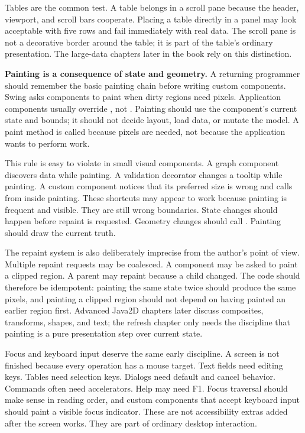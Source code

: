 Tables are the common test. A table belongs in a scroll pane because the header, viewport, and scroll bars cooperate. Placing a table directly in a panel may look acceptable with five rows and fail immediately with real data. The scroll pane is not a decorative border around the table; it is part of the table's ordinary presentation. The large-data chapters later in the book rely on this distinction.

\textbf{Painting is a consequence of state and geometry.} A returning
programmer should remember the basic painting chain before writing custom
components. Swing asks components to paint when dirty regions need pixels.
Application components usually override , not .
Painting should use the component's current state and bounds; it should not
decide layout, load data, or mutate the model. A paint method is called because
pixels are needed, not because the application wants to perform work.

This rule is easy to violate in small visual components. A graph component
discovers data while painting. A validation decorator changes a tooltip while
painting. A custom component notices that its preferred size is wrong and calls
 from inside painting. These shortcuts may appear to work
because painting is frequent and visible. They are still wrong boundaries.
State changes should happen before repaint is requested. Geometry changes
should call . Painting should draw the current truth.

The repaint system is also deliberately imprecise from the author's point of
view. Multiple repaint requests may be coalesced. A component may be asked to
paint a clipped region. A parent may repaint because a child changed. The code
should therefore be idempotent: painting the same state twice should produce
the same pixels, and painting a clipped region should not depend on having
painted an earlier region first. Advanced Java2D chapters later discuss
composites, transforms, shapes, and text; the refresh chapter only needs the
discipline that painting is a pure presentation step over current state.

Focus and keyboard input deserve the same early discipline. A screen is not
finished because every operation has a mouse target. Text fields need editing
keys. Tables need selection keys. Dialogs need default and cancel behavior.
Commands often need accelerators. Help may need F1. Focus traversal should make
sense in reading order, and custom components that accept keyboard input should
paint a visible focus indicator. These are not accessibility extras added after
the screen works. They are part of ordinary desktop interaction.


